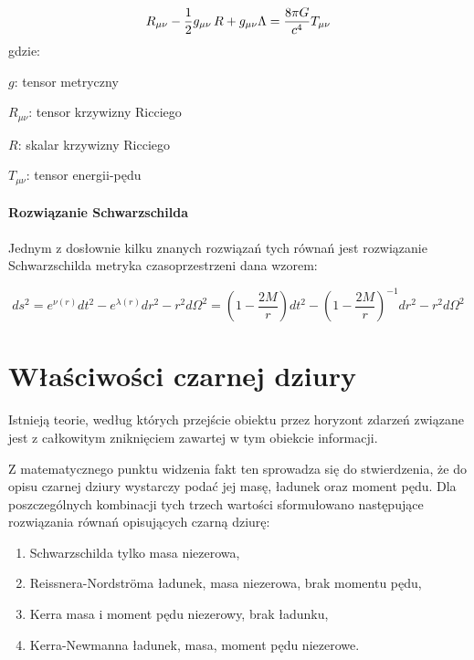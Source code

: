 \documentclass[12pt]{article}
\begin{document}
\begin{equation*}
R_{\mu \nu} - {1 \over 2}g_{\mu \nu}\,R + g_{\mu \nu} \Lambda = 
 {8 \pi G \over c^4} T_{\mu \nu}
\end{equation*}
gdzie:
\begin{description}
    \item $g$: tensor metryczny
    \item $R_{\mu \nu}$: tensor krzywizny Ricciego
    \item $R$: skalar krzywizny Ricciego
    \item $T_{\mu \nu}$: tensor energii-p\k{e}du
\end{description}


\paragraph{Rozwi\k{a}zanie Schwarzschilda}
Jednym z dos\l{}ownie kilku znanych rozwi\k{a}za\'{n} tych r\'{o}wna\'{n} jest rozwi\k{a}zanie Schwarzschilda \textendash{} metryka czasoprzestrzeni dana wzorem:

\begin{equation*}
ds^2 = e^{\nu(r)} dt^2 - e^{\lambda(r)} dr^2 - r^2 d\Omega^2 = \left(1 - \frac{2M}{r}\right) dt^2 - \left(1 - \frac{2M}{r}\right)^{-1}dr^2 - r^2 d\Omega^2
\end{equation*}
\newpage

\section{W\l{}a\'{s}ciwo\'{s}ci czarnej dziury}
Istniej\k{a} teorie, wed\l{}ug kt\'{o}rych przej\'{s}cie obiektu przez horyzont zdarze\'{n} zwi\k{a}zane jest z ca\l{}kowitym znikni\k{e}ciem zawartej w tym obiekcie informacji.

Z matematycznego punktu widzenia fakt ten sprowadza si\k{e} do stwierdzenia, \.{z}e do opisu czarnej dziury wystarczy poda\'{c} jej mas\k{e}, \l{}adunek oraz moment p\k{e}du. Dla poszczeg\'{o}lnych kombinacji tych trzech warto\'{s}ci sformu\l{}owano nast\k{e}puj\k{a}ce rozwi\k{a}zania r\'{o}wna\'{n} opisuj\k{a}cych czarn\k{a} dziur\k{e}:
 
\begin{enumerate}
	\item Schwarzschilda \textendash{} tylko masa niezerowa,
	\item Reissnera-Nordstr\"{o}ma \textendash{} \l{}adunek, masa niezerowa, brak 		momentu p\k{e}du,
	\item Kerra \textendash{} masa i moment p\k{e}du niezerowy, brak \l{}adunku,
	\item Kerra-Newmanna \textendash{} \l{}adunek, masa, moment p\k{e}du 				niezerowe.
\end{enumerate}
\end{document}
